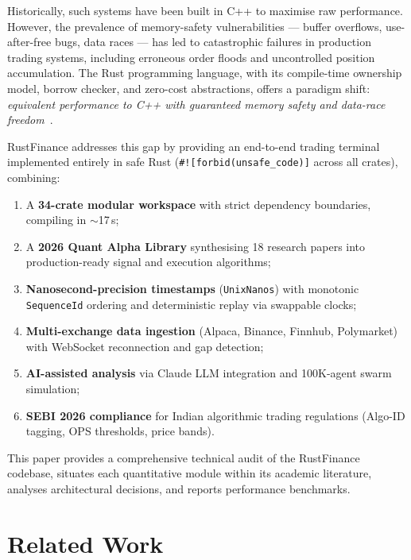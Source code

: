 \documentclass[11pt]{article}
\theoremstyle{definition}
\begin{document}
Historically, such systems have been built in C++ to maximise raw
performance. However, the prevalence of memory-safety vulnerabilities
--- buffer overflows, use-after-free bugs, data races --- has led to
catastrophic failures in production trading systems, including
erroneous order floods and uncontrolled position accumulation.
The Rust programming language, with its compile-time ownership model,
borrow checker, and zero-cost abstractions, offers a paradigm shift:
\emph{equivalent performance to C++ with guaranteed memory safety and
data-race freedom}~\cite{klabnik2023}.

RustFinance addresses this gap by providing an end-to-end trading
terminal implemented entirely in safe Rust (\texttt{\#![forbid(unsafe\_code)]}
across all crates), combining:

\begin{enumerate}[leftmargin=*,topsep=3pt,itemsep=1pt]
  \item A \textbf{34-crate modular workspace} with strict dependency
        boundaries, compiling in $\sim$17\,s;
  \item A \textbf{2026 Quant Alpha Library} synthesising 18 research
        papers into production-ready signal and execution algorithms;
  \item \textbf{Nanosecond-precision timestamps} (\texttt{UnixNanos})
        with monotonic \texttt{SequenceId} ordering and deterministic
        replay via swappable clocks;
  \item \textbf{Multi-exchange data ingestion} (Alpaca, Binance,
        Finnhub, Polymarket) with WebSocket reconnection and gap
        detection;
  \item \textbf{AI-assisted analysis} via Claude LLM integration
        and 100K-agent swarm simulation;
  \item \textbf{SEBI 2026 compliance} for Indian algorithmic trading
        regulations (Algo-ID tagging, OPS thresholds, price bands).
\end{enumerate}

This paper provides a comprehensive technical audit of the RustFinance
codebase, situates each quantitative module within its academic
literature, analyses architectural decisions, and reports performance
benchmarks.

\section{Related Work}
\label{sec:related}
\end{document}
